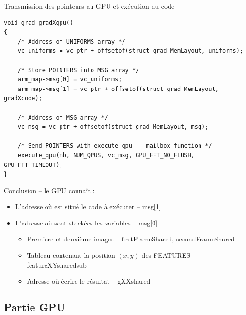\documentclass{bredelebeamer}
\begin{document}
\begin{frame}[fragile]{Transmission des pointeurs au GPU et exécution du code}

\begin{lstlisting}
void grad_gradXqpu()
{
    /* Address of UNIFORMS array */
    vc_uniforms = vc_ptr + offsetof(struct grad_MemLayout, uniforms);

    /* Store POINTERS into MSG array */
    arm_map->msg[0] = vc_uniforms;
    arm_map->msg[1] = vc_ptr + offsetof(struct grad_MemLayout, gradXcode);

    /* Address of MSG array */
    vc_msg = vc_ptr + offsetof(struct grad_MemLayout, msg);

    /* Send POINTERS with execute_qpu -- mailbox function */
    execute_qpu(mb, NUM_QPUS, vc_msg, GPU_FFT_NO_FLUSH, GPU_FFT_TIMEOUT);
}
\end{lstlisting}

\begin{alertblock}{Conclusion -- le GPU conna\^it :}
\begin{itemize}
\item L'adresse où est situé le code à exécuter -- msg[1]
\item L'adresse où sont stockées les variables -- msg[0]
	\begin{itemize}
		\item Première et deuxième images -- firstFrameShared, secondFrameShared
		\item Tableau contenant la position $(x,y)$ des FEATURES -- featureXYsharedsub
		\item Adresse où écrire le résultat -- gXXshared
	\end{itemize}
\end{itemize}
\end{alertblock}

\end{frame}



\subsection{Partie GPU}

\end{document}
